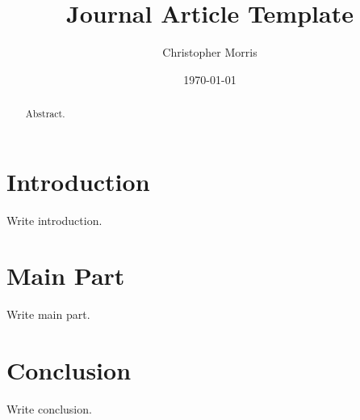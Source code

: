 \documentclass[	
	paper = a4,
	fontsize = 11pt,
	DIV = 12,
	abstract = true
]{scrartcl}
\theoremstyle{plain}
\theoremstyle{definition}
\begin{document}
\title{Journal Article Template}

\renewcommand\Affilfont{\large}
\renewcommand\Authfont{\large}
\setlength{\affilsep}{0.5em}
\author[*]{Christopher Morris}
\date{\vspace*{-1.0em}\small\today\vspace*{-1.0em}}

\maketitle

\begin{abstract}
Abstract.
\end{abstract}

\section{Introduction}
Write introduction.

\section{Main Part}
Write main part.

\section{Conclusion}
Write conclusion.

\printbibliography
\end{document}
